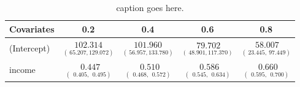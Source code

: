 %
\begin{table}[hptb]
\begin{center}
\begin{tabular}{|l||c|c|c|c|} \hline
\multicolumn{1}{|l||}{Covariates}&\multicolumn{1}{c|}{0.2}&\multicolumn{1}{c|}{0.4}&\multicolumn{1}{c|}{0.6}&\multicolumn{1}{c|}{0.8}\\ \hline
(Intercept)&$\underset{(~65.207,129.072)}{102.314}$&$\underset{(~56.957,133.780)}{101.960}$&$\underset{(~48.901,117.370)}{~79.702}$&$\underset{(~23.445,~97.449)}{~58.007}$\\ 
income&$\underset{(~~0.405,~~0.495)}{~~0.447}$&$\underset{(~~0.468,~~0.572)}{~~0.510}$&$\underset{(~~0.545,~~0.634)}{~~0.586}$&$\underset{(~~0.595,~~0.700)}{~~0.660}$\\ 
\hline
\end{tabular}
\vspace{3mm}
\caption{caption goes here.\label{out.tex}} 
\end{center}
\end{table}
